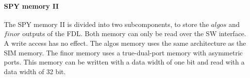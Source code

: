 %

\paragraph{SPY memory II}
The SPY memory II is divided into two subcomponents, to store the $algos$ and $finor$ outputs of the FDL.
Both memory can only be read over the SW interface. A write access has no effect.
The algos memory uses the same architecture as the SIM memory.
The finor memory uses a true-dual-port memory with asymmetric ports. This memory can be written with a data width of one bit and read with a data width of 32 bit.

